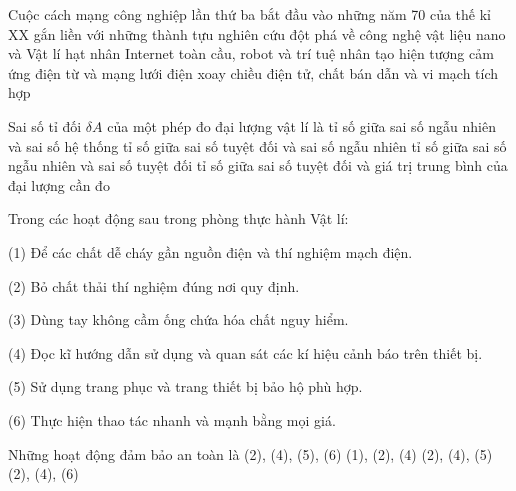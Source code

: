 \begin{ex}
	Cuộc cách mạng công nghiệp lần thứ ba bắt đầu vào những năm 70 của thế kỉ XX gắn liền với những thành tựu nghiên cứu đột phá về
	\choice
	{công nghệ vật liệu nano và Vật lí hạt nhân}
	{Internet toàn cầu, robot và trí tuệ nhân tạo}
	{hiện tượng cảm ứng điện từ và mạng lưới điện xoay chiều}
	{\True điện tử, chất bán dẫn và vi mạch tích hợp}
\end{ex}

\begin{ex}
	Sai số tỉ đối $\delta A$ của một phép đo đại lượng vật lí là
	\choice
	{tỉ số giữa sai số ngẫu nhiên và sai số hệ thống}
	{tỉ số giữa sai số tuyệt đối và sai số ngẫu nhiên}
	{tỉ số giữa sai số ngẫu nhiên và sai số tuyệt đối}
	{\True tỉ số giữa sai số tuyệt đối và giá trị trung bình của đại lượng cần đo}
\end{ex}

\begin{ex}
	Trong các hoạt động sau trong phòng thực hành Vật lí: \par (1) Để các chất dễ cháy gần nguồn điện và thí nghiệm mạch điện. \par (2) Bỏ chất thải thí nghiệm đúng nơi quy định. \par (3) Dùng tay không cầm ống chứa hóa chất nguy hiểm. \par (4) Đọc kĩ hướng dẫn sử dụng và quan sát các kí hiệu cảnh báo trên thiết bị. \par (5) Sử dụng trang phục và trang thiết bị bảo hộ phù hợp. \par (6) Thực hiện thao tác nhanh và mạnh bằng mọi giá. \par Những hoạt động đảm bảo an toàn là
	\choice
	{(2), (4), (5), (6)}
	{(1), (2), (4)}
	{\True (2), (4), (5)}
	{(2), (4), (6)}
\end{ex}

